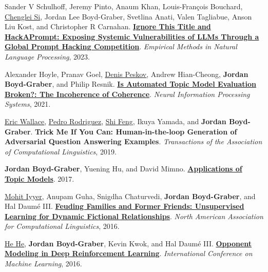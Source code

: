 \documentclass[10pt,a4paper]{article} %
\begin{document}
\begin{multicols}{2}  %

\small

\begin{enumerate*}

\item Sander V Schulhoff, Jeremy Pinto, Anaum Khan, Louis-François Bouchard, \underline{\href{https://noviscl.github.io/}{Chenglei Si}}, Jordan Lee Boyd-Graber, Svetlina Anati, Valen Tagliabue, Anson Liu Kost, and Christopher R Carnahan.  {\bf \href{http://umiacs.umd.edu/~jbg//docs/2023_emnlp_hackaprompt.pdf}{Ignore This Title and HackAPrompt: Exposing Systemic Vulnerabilities of LLMs Through a Global Prompt Hacking Competition}}.  \emph{Empirical Methods in Natural Language Processing}, 2023.

	 \item Alexander Hoyle, Pranav Goel, \underline{\href{http://denispeskov.github.io/}{Denis Peskov}}, Andrew Hian-Cheong, {\bf Jordan Boyd-Graber}, and Philip Resnik.  {\bf \href{http://umiacs.umd.edu/~jbg//docs/2021_neurips_incoherence.pdf}{Is Automated Topic Model Evaluation Broken?: The Incoherence of Coherence}}.  \emph{Neural Information Processing Systems}, 2021.

  
\item \underline{\href{http://www.ericswallace.com/}{Eric Wallace}}, \underline{\href{https://www.pedro.ai}{Pedro Rodriguez}}, \underline{\href{http://users.umiacs.umd.edu/~shifeng/}{Shi Feng}}, Ikuya Yamada, and {\bf Jordan Boyd-Graber}.  {\bf Trick Me If You Can: Human-in-the-loop Generation of Adversarial Question Answering Examples}.  \emph{Transactions of the Association of Computational Linguistics}, 2019.

\item {\bf Jordan Boyd-Graber}, Yuening Hu, and David Mimno.  {\bf \href{http://www.nowpublishers.com/article/Details/INR-030}{Applications of Topic Models}}.  2017.

\item \underline{Mohit Iyyer}, Anupam Guha, Snigdha Chaturvedi, {\bf Jordan Boyd-Graber}, and Hal {Daum\'{e} III}.  {\bf \href{http://cs.colorado.edu/~jbg//docs/2016_naacl_relationships.pdf}{Feuding Families and Former Friends: Unsupervised Learning for Dynamic Fictional Relationships}}.  \emph{North American Association for Computational Linguistics}, 2016.

	 \item \underline{\href{http://www.umiacs.umd.edu/~hhe/}{He He}}, {\bf Jordan Boyd-Graber}, Kevin Kwok, and Hal {Daum\'{e} III}.  {\bf \href{http://umiacs.umd.edu/~jbg//docs/2016_icml_opponent.pdf}{Opponent Modeling in Deep Reinforcement Learning}}.  \emph{International Conference on Machine Learning}, 2016.


\end{enumerate*}
\end{multicols}
\end{document}
